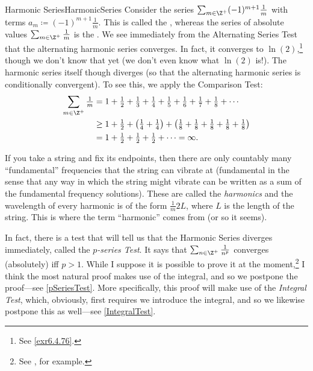 \begin{exm}{Harmonic Series}{HarmonicSeries}
Consider the series $\sum _{m\in \Z ^+}(-1)^{m+1}\frac{1}{m}$ with terms $a_m\coloneqq (-1)^{m+1}\frac{1}{m}$.  This is called the , whereas the series of absolute values $\sum _{m\in \Z ^+}\frac{1}{m}$ is the .  We see immediately from the Alternating Series Test that the alternating harmonic series converges.  In fact, it converges to $\ln (2)$,\footnote{See \cref{exr6.4.76}.} though we don't know that yet (we don't even know what $\ln (2)$ is!).  The harmonic series itself though diverges (so that the alternating harmonic series is conditionally convergent).  To see this, we apply the Comparison Test:
\begin{equation}
\begin{split}
\sum _{m\in \Z ^+}\tfrac{1}{m} & =1+\tfrac{1}{2}+\tfrac{1}{3}+\tfrac{1}{4}+\tfrac{1}{5}+\tfrac{1}{6}+\tfrac{1}{7}+\tfrac{1}{8}+\cdots \\
& \geq 1+\tfrac{1}{2}+\left( \tfrac{1}{4}+\tfrac{1}{4}\right) +\left( \tfrac{1}{8}+\tfrac{1}{8}+\tfrac{1}{8}+\tfrac{1}{8}+\tfrac{1}{8}\right) \\
& =1+\tfrac{1}{2}+\tfrac{1}{2}+\tfrac{1}{2}+\cdots =\infty .
\end{split}
\end{equation}
\begin{rmk}
If you take a string and fix its endpoints, then there are only countably many ``fundamental'' frequencies that the string can vibrate at (fundamental in the sense that any way in which the string might vibrate can be written as a sum of the fundamental frequency solutions).  These are called the \emph{harmonics} and the wavelength of every harmonic is of the form $\frac{1}{m}2L$, where $L$ is the length of the string.  This is where the term ``harmonic'' comes from (or so it seems).
\end{rmk}
\end{exm}
In fact, there is a test that will tell us that the Harmonic Series diverges immediately, called the \emph{$p$-series Test}.  It says that $\sum _{n\in \Z ^+}\frac{1}{n^p}$ converges (absolutely) iff $p>1$.  While I suppose it is possible to prove it at the moment,\footnote{See \cite{Yang}, for example.} I think the most natural proof makes use of the integral, and so we postpone the proof---see \cref{pSeriesTest}.  More specifically, this proof will make use of the \emph{Integral Test}, which, obviously, first requires we introduce the integral, and so we likewise postpone this as well---see \cref{IntegralTest}.

